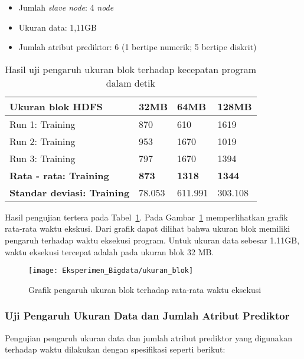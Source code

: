 \begin{itemize}
	\item Jumlah \textit{slave node}: 4 \textit{node}
	\item Ukuran data: 1,11GB
	\item Jumlah atribut prediktor: 6 (1 bertipe numerik; 5 bertipe diskrit)
\end{itemize}

\begin{table}[H]
\label{tab:uji pengaruh ukuran blok}
\centering
\caption{Hasil uji pengaruh ukuran blok terhadap kecepatan program dalam detik}
\begin{tabular}{ | l | l | l | l | }
\hline
Ukuran blok HDFS & 32MB & 64MB & 128MB \\ \hline \hline
Run 1: Training & 870 & 610 & 1619 \\ \hline
Run 2: Training & 953 & 1670 & 1019 \\ \hline
Run 3: Training & 797 & 1670 & 1394 \\ \hline
\textbf{Rata - rata: Training} & \textbf{873} & \textbf{1318} & \textbf{1344} \\ \hline
\textbf{Standar deviasi: Training} & 78.053 & 611.991 & 303.108 \\ \hline
\end{tabular}
\end{table}

Hasil pengujian tertera pada Tabel~\ref{tab:uji pengaruh ukuran blok}. Pada Gambar~\ref{fig:Grafik pengaruh ukuran blok terhadap rata-rata waktu eksekusi} memperlihatkan grafik rata-rata waktu ekskusi. Dari grafik dapat dilihat bahwa ukuran blok memiliki pengaruh terhadap waktu eksekusi program. Untuk ukuran data sebesar 1.11GB, waktu eksekusi tercepat adalah pada ukuran blok 32 MB.

\begin{figure}[H]
	\centering
	\texttt{[image: Eksperimen\_Bigdata/ukuran\_blok]}
	\caption[Grafik pengaruh ukuran blok terhadap rata-rata waktu eksekusi]{Grafik pengaruh ukuran blok terhadap rata-rata waktu eksekusi}
	\label{fig:Grafik pengaruh ukuran blok terhadap rata-rata waktu eksekusi}
\end{figure}


\subsubsection{Uji Pengaruh Ukuran Data dan Jumlah Atribut Prediktor}

Pengujian pengaruh ukuran data dan jumlah atribut prediktor yang digunakan terhadap waktu dilakukan dengan spesifikasi seperti berikut:

